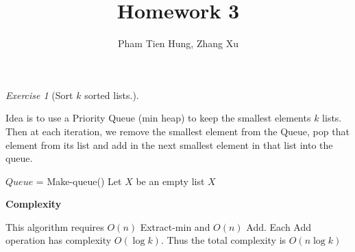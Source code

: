 \documentclass[a4paper,10pt,twoside]{article}
\title{Homework 3}
\author{Pham Tien Hung, Zhang Xu}
\date{}
\theoremstyle{plain}
\theoremstyle{definition}
\theoremstyle{remark}
\theoremstyle{exercise}
\newtheorem{exercise}{Exercise}
\begin{document}
\maketitle
\begin{exercise}[Sort $k$ sorted lists.]\

Idea is to use a Priority Queue (min heap) to keep the smallest
elements $k$ lists. Then at each iteration, we remove the smallest
element from the Queue, pop that element from its list and add in
the next smallest element in that list into the queue.
\begin{algorithm}[h]
	\caption{Sort $k$ sorted lists ($L[1...k][:]$)}
	$Queue$ = Make-queue()\;
	Let $X$ be an empty list\;
	\Return $X$\;
\end{algorithm}

\textbf{Complexity}

This algorithm requires $O(n)$ Extract-min and $O(n)$ Add. Each Add 
operation has complexity $O(\log k)$. Thus the total complexity is
$O(n \log k)$


\end{exercise}
\end{document}
